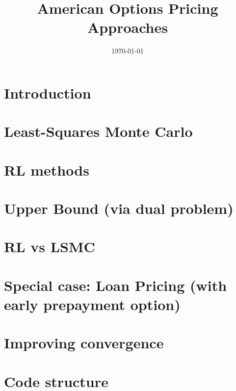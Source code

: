 \documentclass[8pt]{article}
\renewcommand{\|}{\ensuremath{\hspace{0.1cm} | \hspace{0.1cm}}}
\begin{document}
    \title{American Options Pricing Approaches}

    \date{\today}

    \maketitle

    

    \tableofcontents

    \section{Introduction}
        

    \section{Least-Squares Monte Carlo \cite{LSMC}}
        

    \section{RL methods}
        

    \section{Upper Bound (via dual problem)}
        


    \section{RL vs LSMC}
        

    \appendix
    \section{Special case: Loan Pricing (with early prepayment option)}
        

    \section{Improving convergence}
        

    \section{Code structure}
        

    \nocite{*}
    \printbibliography
\end{document}
